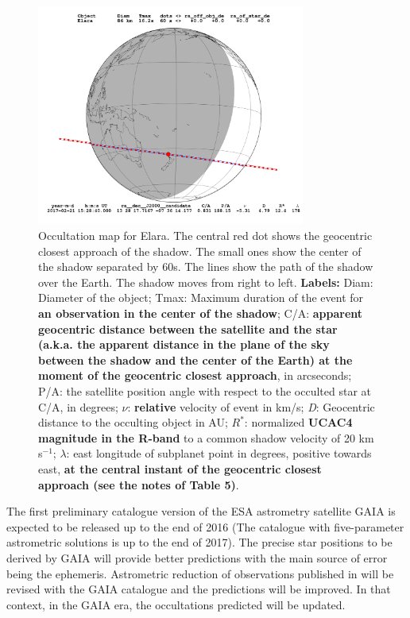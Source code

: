 \documentclass[useAMS,usenatbib]{mn2e}
\begin{document}
\begin{figure}
\begin{centering}
\includegraphics[width = 8.8cm]{figures/Elara_2017-02-21T15:28:40.png}   
\caption{Occultation map for Elara. %
The central red dot shows the geocentric closest approach of the shadow. The small ones show the center of the shadow separated by 60s. The lines show the path of the shadow over the Earth. The shadow moves from right to left.
\textbf{Labels:} Diam: Diameter of the object; Tmax: Maximum duration of the event for\textbf{ an observation in the center of the shadow}; C/A: \textbf{apparent geocentric distance between the satellite and the star (a.k.a. the apparent distance in the plane of the sky between the shadow and the center of the Earth) at the moment of the geocentric closest approach}, in arcseconds; P/A: the satellite position angle with respect to the occulted star at C/A, in degrees; $\nu$: \textbf{relative} velocity of event in km/s; {\it D}: Geocentric distance to the occulting object in AU; $R^*$: normalized \textbf{UCAC4 magnitude in the R-band} to a common shadow velocity of 20 km s$^{-1}$; $\lambda$: east longitude of subplanet point in degrees, positive towards east, \textbf{at the central instant of the geocentric closest approach (see the notes of Table 5)}.}
\label{Fig: ocultacao}
\end{centering}
\end{figure}

The first preliminary catalogue version of the ESA astrometry satellite GAIA \citep{deBruijne2012} is expected to be released up to the end of 2016 (The catalogue with five-parameter astrometric solutions is up to the end of 2017). The precise star positions to be derived by GAIA will provide better predictions with the main source of error being the ephemeris. Astrometric reduction of observations published in  will be revised with the GAIA catalogue and the predictions will be improved. In that context, in the GAIA era, the occultations predicted will be updated.
\end{document}
